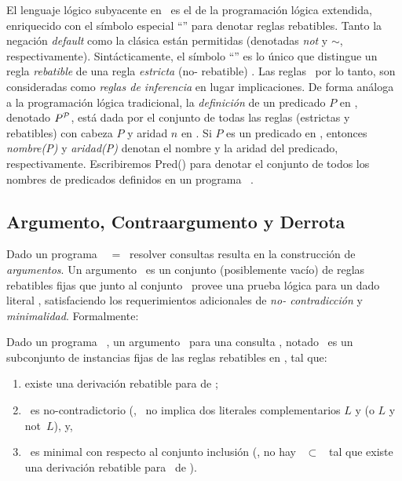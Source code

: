  El lenguaje lógico subyacente en \DLP\ es el de la programación lógica
 extendida, enriquecido con el símbolo especial ``\drule{}{}'' para
 denotar reglas rebatibles. Tanto la negación  \textit{default} como la
 clásica están permitidas (denotadas \textit{not} y \textit{$\sim$},
 respectivamente). Sintácticamente, el símbolo ``\drule{}{}'' es lo
 único que distingue un regla \textit{rebatible}
  de una regla \textit{estricta} (no-
 rebatible) .  Las reglas \DLP\, por lo tanto,
 son consideradas como \textit{reglas de inferencia} en lugar
 implicaciones. De forma análoga a la programación lógica tradicional,
 la \textit{definición} de un predicado $P$ en \PP , denotado
 $P^{\scriptsize{\mbox{${\mathcal P}$}}}$, está dada por el conjunto de todas las reglas
 (estrictas y rebatibles) con cabeza $P$  y aridad $n$ en \PP . Si $P$
 es un predicado en \PP , entonces \textit{nombre(P)} y
 \textit{aridad(P)} denotan el nombre y la aridad del predicado,
 respectivamente. Escribiremos \textsf{Pred}(\PP) para denotar el
 conjunto de todos los nombres de predicados definidos en un programa
 \DLP\ \PP.

\subsection{Argumento, Contraargumento y Derrota}
 \label{sub:argumento_contraargumento_derrota}
 
 Dado un programa \DLP\ \PP\ = \SD\, resolver consultas resulta en la
 construcción de \textit{argumentos}. Un argumento \ArgA\ es un
 conjunto (posiblemente vacío) de reglas rebatibles fijas que junto al
 conjunto \SSet\  provee una prueba lógica para un dado literal \ArgQ,
 satisfaciendo los requerimientos adicionales de  \textit{no-
 contradicción} y \textit{minimalidad}. Formalmente:
 
 \begin{definicion}[Argumento]
 \label{def:argumento}
 
 Dado un programa \DLP\ \PP, un argumento \ArgA\ para una consulta
 \ArgQ, notado \AQ\, es un subconjunto de  instancias fijas de las
 reglas rebatibles en \PP, tal que:
    
 \begin{enumerate}[(1)]
 \item existe una derivación rebatible para \ArgQ de \SyA;
 
 \item \SyA\ es no-contradictorio (\ie, \SyA\ no implica dos literales
 complementarios $L$ y  (o $L$ y \textsf{not}\ $L$), y,
 
 \item \ArgA\ es minimal con respecto al conjunto inclusión (\ie, no
 hay \Ap\ $\subset$ \ArgA\ tal que existe una derivación rebatible para
 \ArgQ\ de \SyAp).
 
 \end{enumerate}
 \end{definicion}


